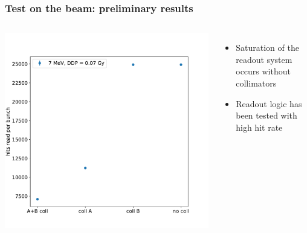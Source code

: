     \begin{frame}
        \frametitle{Test on the beam: preliminary results}
        \begin{columns}
                \includegraphics[width=1.1\linewidth]{figures/test_beam/hits.pdf}  
                \begin{itemize}
                    \item Saturation of the readout system occurs without collimators
                    \item Readout logic has been tested with high hit rate
                \end{itemize}
            \end{columns}
        \end{frame}  